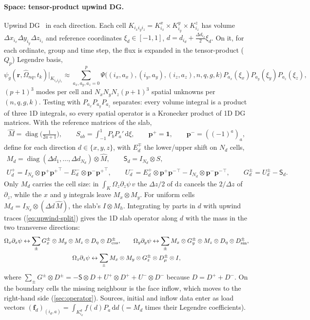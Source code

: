 \documentclass[11pt,a4paper]{article}
\newcommand{\Om}{\hat{\Omega}}
\newcommand{\dd}{\mathrm{d}}
\newcommand{\kron}{\otimes}
\newcommand{\pp}{{\bm{p}^{+}}}
\newcommand{\pmn}{{\bm{p}^{-}}}
\newcommand{\diag}{\operatorname{diag}}
\begin{document}
\paragraph{Space: tensor-product upwind DG.} Upwind DG~\cite{ReedHill} in each direction. Each cell $K_{i_xi_yi_z}=K^x_{i_x}\times K^y_{i_y}\times K^z_{i_z}$ has volume $\Delta x_{i_x}\Delta y_{i_y}\Delta z_{i_z}$ and reference coordinates $\xi_d\in[-1,1]$, $d=d_{i_d}+\frac{\Delta d_{i_d}}2\xi_d$. On it, for each ordinate, group and time step, the flux is expanded in the tensor-product ($Q_p$) Legendre basis,
\begin{equation}
\psi_g(\bm r,\Om_{nq},t_k)\big|_{K_{i_xi_yi_z}}\approx\sum_{a_x,a_y,a_z=0}^{p}\Psi\big((i_x,a_x),(i_y,a_y),(i_z,a_z),n,q,g,k\big)\,P_{a_x}(\xi_x)P_{a_y}(\xi_y)P_{a_z}(\xi_z),
\end{equation}
$(p+1)^3$ modes per cell and $N_xN_yN_z(p+1)^3$ spatial unknowns per $(n,q,g,k)$. Testing with $P_{a_x}P_{a_y}P_{a_z}$ separates: every volume integral is a product of three 1D integrals, so every spatial operator is a Kronecker product of 1D DG matrices. With the reference matrices of the slab,
\begin{gather}
\hat M=\diag\Big(\frac{1}{2a+1}\Big),\qquad
S_{ab}=\int_{-1}^1P_bP_a'\,\dd\xi,\qquad \pp=\bm 1,\qquad \pmn=((-1)^a)_a,
\end{gather}
define for each direction $d\in\{x,y,z\}$, with $E^\mp_d$ the lower/upper shift on $N_d$ cells,
\begin{gather}
M_d=\diag(\Delta d_1,\dots,\Delta d_{N_d})\kron\hat M,\qquad \mathsf S_d=I_{N_d}\kron S,\\
U_d^+=I_{N_d}\kron\pp\pp^{\!\top}-E^-_d\kron\pmn\pp^{\!\top},\qquad
U_d^-=E^+_d\kron\pp\pmn^{\!\top}-I_{N_d}\kron\pmn\pmn^{\!\top},\qquad
G^\pm_d=U^\pm_d-\mathsf S_d .
\end{gather}
Only $M_d$ carries the cell size: in $\int_K\Omega_z\partial_z\psi\,v$ the $\Delta z/2$ of $\dd z$ cancels the $2/\Delta z$ of $\partial_z$, while the $x$ and $y$ integrals leave $M_x\kron M_y$. For uniform cells $M_d=I_{N_d}\kron(\Delta d\,\hat M)$, the slab's $I\kron M_h$. Integrating by parts in $d$ with upwind traces (\cref{eq:upwind-split}) gives the 1D slab operator along $d$ with the mass in the two transverse directions:
\begin{gather}
\Omega_x\partial_x\psi\leftrightarrow\sum_\pm G^\pm_x\kron M_y\kron M_z\kron D_\eta\kron D^\pm_{\cos},\qquad
\Omega_y\partial_y\psi\leftrightarrow\sum_\pm M_x\kron G^\pm_y\kron M_z\kron D_\eta\kron D^\pm_{\sin},\notag\\
\Omega_z\partial_z\psi\leftrightarrow\sum_\pm M_x\kron M_y\kron G^\pm_z\kron D^\pm_\mu\kron I,
\label{eq:streaming}
\end{gather}
where $\sum_\pm G^\pm\kron D^\pm=-\mathsf S\kron D+U^+\kron D^++U^-\kron D^-$ because $D=D^++D^-$. On the boundary cells the missing neighbour is the face inflow, which moves to the right-hand side (\cref{sec:operator}). Sources, initial and inflow data enter as load vectors $(\bm f_d)_{(i_d,a)}=\int_{K^d_{i_d}}f(d)P_a\,\dd d$ ($=M_d$ times their Legendre coefficients).
\end{document}
